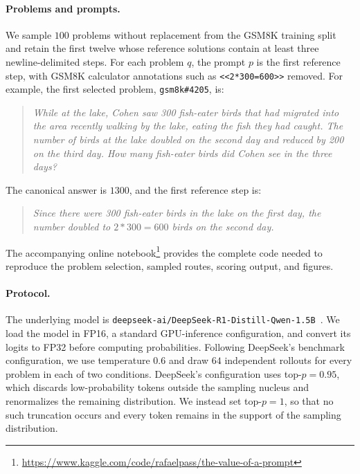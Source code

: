 \documentclass[letterpaper]{article} %
\theoremstyle{definition}
\theoremstyle{remark}
\begin{document}
\paragraph{Problems and prompts.}
We sample \(100\) problems without replacement from the
GSM8K training split and retain the first twelve whose reference solutions
contain at least three newline-delimited steps. For each problem \(q\), the prompt \(p\) is the first reference step, with
GSM8K calculator annotations such as \texttt{<<2*300=600>>} removed. For
example, the first selected problem, \texttt{gsm8k\#4205}, is:
\begin{quote}
\emph{While at the lake, Cohen saw 300 fish-eater birds that had migrated into
the area recently walking by the lake, eating the fish they had caught. The
number of birds at the lake doubled on the second day and reduced by 200 on the
third day. How many fish-eater birds did Cohen see in the three days?}
\end{quote}
The canonical answer is \(1300\), and the first reference step is:
\begin{quote}
\emph{Since there were 300 fish-eater birds in the lake on the first day, the
number doubled to \(2*300=600\) birds on the second day.}
\end{quote}

The accompanying online notebook\footnote{\url{https://www.kaggle.com/code/rafaelpass/the-value-of-a-prompt}}
provides the complete code needed to reproduce the problem selection, sampled
routes, scoring output, and figures.

\paragraph{Protocol.}
The underlying model is
\texttt{deepseek-ai/DeepSeek-R1-Distill-Qwen-1.5B}~\cite{DeepSeekR1}. We load
the model in FP16, a standard GPU-inference configuration, and convert its logits to FP32 before computing probabilities. Following DeepSeek's benchmark
configuration, we use temperature \(0.6\) and draw \(64\) independent rollouts
for every problem in each of two conditions. DeepSeek's configuration uses
top-\(p=0.95\), which discards low-probability tokens outside the sampling
nucleus and renormalizes the remaining distribution. 
We instead set top-\(p=1\), so that no such truncation occurs and every token
remains in the support of the sampling distribution.
\end{document}

